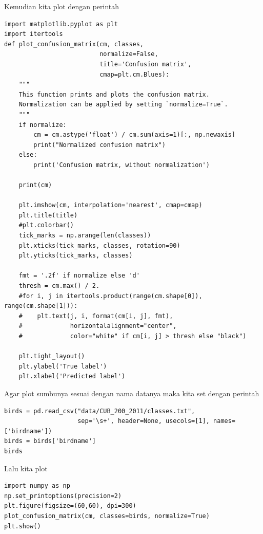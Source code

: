 Kemudian kita plot dengan perintah
\begin{lstlisting}[caption=Plotting Confusion Matrix,label={lst:3.16}]
import matplotlib.pyplot as plt
import itertools
def plot_confusion_matrix(cm, classes,
                          normalize=False,
                          title='Confusion matrix',
                          cmap=plt.cm.Blues):
    """
    This function prints and plots the confusion matrix.
    Normalization can be applied by setting `normalize=True`.
    """
    if normalize:
        cm = cm.astype('float') / cm.sum(axis=1)[:, np.newaxis]
        print("Normalized confusion matrix")
    else:
        print('Confusion matrix, without normalization')

    print(cm)

    plt.imshow(cm, interpolation='nearest', cmap=cmap)
    plt.title(title)
    #plt.colorbar()
    tick_marks = np.arange(len(classes))
    plt.xticks(tick_marks, classes, rotation=90)
    plt.yticks(tick_marks, classes)

    fmt = '.2f' if normalize else 'd'
    thresh = cm.max() / 2.
    #for i, j in itertools.product(range(cm.shape[0]), range(cm.shape[1])):
    #    plt.text(j, i, format(cm[i, j], fmt),
    #             horizontalalignment="center",
    #             color="white" if cm[i, j] > thresh else "black")

    plt.tight_layout()
    plt.ylabel('True label')
    plt.xlabel('Predicted label')

\end{lstlisting}

 Agar plot sumbunya sesuai dengan nama datanya maka kita set dengan perintah
\begin{lstlisting}[caption=Membaca file classes.txt,label={lst:3.17}]
birds = pd.read_csv("data/CUB_200_2011/classes.txt",
                    sep='\s+', header=None, usecols=[1], names=['birdname'])
birds = birds['birdname']
birds

\end{lstlisting}

Lalu kita plot
\begin{lstlisting}[caption=Plot hasil perubahan label,label={lst:3.18}]
import numpy as np
np.set_printoptions(precision=2)
plt.figure(figsize=(60,60), dpi=300)
plot_confusion_matrix(cm, classes=birds, normalize=True)
plt.show()
\end{lstlisting}



